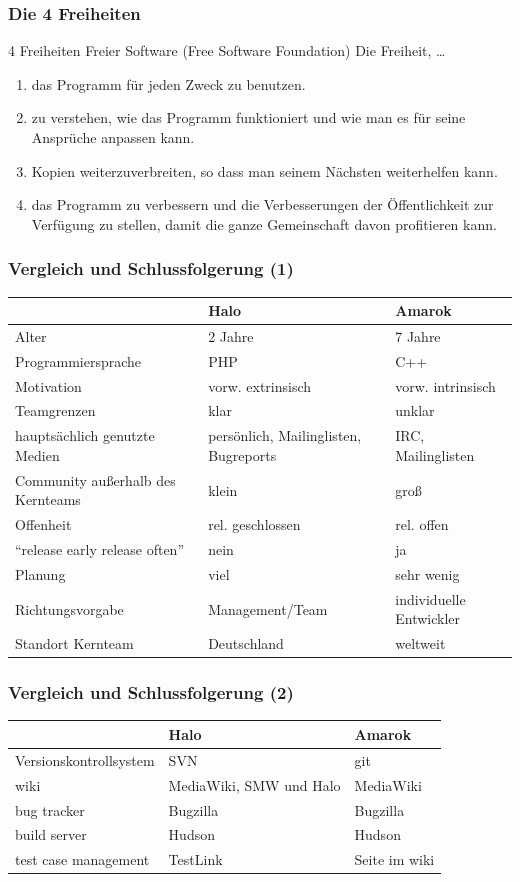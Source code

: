 \documentclass{beamer}
\begin{document}
\begin{frame}
\frametitle{Die 4 Freiheiten}
\begin{block}{4 Freiheiten Freier Software (Free Software Foundation)}
    Die Freiheit, \dots
    \begin{enumerate}
      \item das Programm für jeden Zweck zu benutzen.
      \item zu verstehen, wie das Programm funktioniert und wie man es für seine Ansprüche anpassen kann.
      \item Kopien weiterzuverbreiten, so dass man seinem Nächsten weiterhelfen kann.
      \item das Programm zu verbessern und die Verbesserungen der Öffentlichkeit zur Verfügung zu stellen, damit die ganze Gemeinschaft davon profitieren kann.
    \end{enumerate}
\end{block}
\end{frame}

\begin{frame}
\frametitle{Vergleich und Schlussfolgerung (1)}
\begin{tabularx}{\textwidth}{|X|X|X|}
\hline
 & Halo & Amarok \\
\hline \hline
Alter & 2 Jahre & 7 Jahre \\
\hline
Programmiersprache & PHP & C++ \\
\hline
Motivation & vorw. extrinsisch & vorw. intrinsisch \\
\hline
Teamgrenzen & klar & unklar\\
\hline
haupts\"achlich genutzte Medien & pers\"onlich, Mailinglisten, Bugreports & IRC, Mailinglisten \\
\hline
Community au\ss erhalb des Kernteams & klein & gro\ss \\
\hline
Offenheit & rel. geschlossen & rel. offen \\
\hline
``release early release often'' & nein & ja \\
\hline
Planung & viel & sehr wenig \\
\hline
Richtungsvorgabe & Management/Team & individuelle Entwickler \\
\hline
Standort Kernteam & Deutschland & weltweit \\
\hline
\end{tabularx}
\end{frame}

\begin{frame}
\frametitle{Vergleich und Schlussfolgerung (2)}
\begin{tabularx}{\textwidth}{|X|X|X|}
\hline
 & Halo & Amarok\\
\hline \hline
Versionskontrollsystem & SVN & git\\
\hline
wiki & MediaWiki, SMW und Halo & MediaWiki\\
\hline
bug tracker & Bugzilla & Bugzilla\\
\hline
build server & Hudson & Hudson\\
\hline
test case management & TestLink & Seite im wiki\\
\hline
\end{tabularx}
\end{frame}
\end{document}
